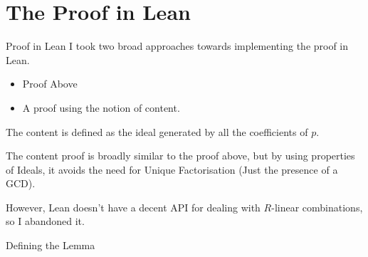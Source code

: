 \documentclass{beamer}
\begin{document}
\section{The Proof in Lean}

\begin{frame}{Proof in Lean}
  I took two broad approaches towards implementing the proof in Lean. 

  \begin{itemize}
    \item Proof Above 
    \item A proof using the notion of content. 
  \end{itemize}

  The content is defined as the ideal generated by all the coefficients of $p$. 
  
  The content proof is broadly similar to the proof above, but by using properties of Ideals, it avoids the need for Unique Factorisation (Just the presence of a GCD). 

  However, Lean doesn't have a decent API for dealing with $R$-linear combinations, so I abandoned it. 

\end{frame}


\begin{frame}{Defining the Lemma}




\end{frame}
\end{document}
